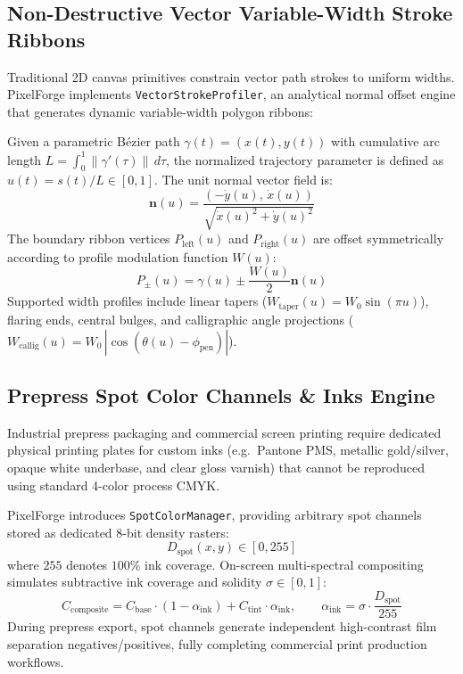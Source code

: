 \documentclass[10pt,journal,compsoc]{IEEEtran}
\begin{document}
\subsection{Non-Destructive Vector Variable-Width Stroke Ribbons}
Traditional 2D canvas primitives constrain vector path strokes to uniform widths. PixelForge implements \texttt{VectorStrokeProfiler}, an analytical normal offset engine that generates dynamic variable-width polygon ribbons:

Given a parametric Bézier path $\gamma(t) = (x(t), y(t))$ with cumulative arc length $L = \int_0^1 \|\gamma'(\tau)\|\, d\tau$, the normalized trajectory parameter is defined as $u(t) = s(t) / L \in [0, 1]$. The unit normal vector field is:
\begin{equation}
\mathbf{n}(u) = \frac{(-\dot{y}(u),\, \dot{x}(u))}{\sqrt{\dot{x}(u)^2 + \dot{y}(u)^2}}
\end{equation}
The boundary ribbon vertices $P_{\text{left}}(u)$ and $P_{\text{right}}(u)$ are offset symmetrically according to profile modulation function $W(u)$:
\begin{equation}
P_{\pm}(u) = \gamma(u) \pm \frac{W(u)}{2} \mathbf{n}(u)
\end{equation}
Supported width profiles include linear tapers ($W_{\text{taper}}(u) = W_0 \sin(\pi u)$), flaring ends, central bulges, and calligraphic angle projections ($W_{\text{callig}}(u) = W_0 \, |\cos(\theta(u) - \phi_{\text{pen}})|$).

\subsection{Prepress Spot Color Channels \& Inks Engine}
Industrial prepress packaging and commercial screen printing require dedicated physical printing plates for custom inks (e.g.\ Pantone PMS, metallic gold/silver, opaque white underbase, and clear gloss varnish) that cannot be reproduced using standard 4-color process CMYK.

PixelForge introduces \texttt{SpotColorManager}, providing arbitrary spot channels stored as dedicated 8-bit density rasters:
\begin{equation}
D_{\text{spot}}(x, y) \in [0, 255]
\end{equation}
where $255$ denotes $100\%$ ink coverage. On-screen multi-spectral compositing simulates subtractive ink coverage and solidity $\sigma \in [0, 1]$:
\begin{equation}
C_{\text{composite}} = C_{\text{base}} \cdot (1 - \alpha_{\text{ink}}) + C_{\text{tint}} \cdot \alpha_{\text{ink}}, \qquad \alpha_{\text{ink}} = \sigma \cdot \frac{D_{\text{spot}}}{255}
\end{equation}
During prepress export, spot channels generate independent high-contrast film separation negatives/positives, fully completing commercial print production workflows.
\end{document}
